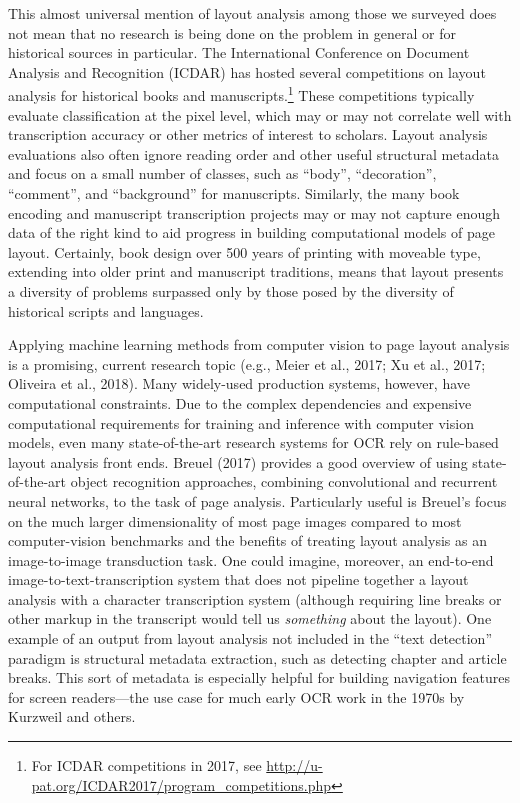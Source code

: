 \documentclass[twoside,11pt]{report}
\begin{document}
This almost universal mention of layout analysis among those we surveyed does not mean that no research is being done on the problem in general or for historical sources in particular. The International Conference on Document Analysis and Recognition (ICDAR) has hosted several competitions on layout analysis for historical books and manuscripts.\footnote{For ICDAR competitions in 2017, see \url{http://u-pat.org/ICDAR2017/program_competitions.php}}  These competitions typically evaluate classification at the pixel level, which may or may not correlate well with transcription accuracy or other metrics of interest to scholars. Layout analysis evaluations also often ignore reading order and other useful structural metadata and focus on a small number of classes, such as ``body'', ``decoration'', ``comment'', and ``background'' for manuscripts. Similarly, the many book encoding and manuscript transcription projects may or may not capture enough data of the right kind to aid progress in building computational models of page layout. Certainly, book design over 500 years of printing with moveable type, extending into older print and manuscript traditions, means that layout presents a diversity of problems surpassed only by those posed by the diversity of historical scripts and languages.

Applying machine learning methods from computer vision to page layout analysis is a promising, current research topic (e.g., Meier et al., 2017; Xu et al., 2017; Oliveira et al., 2018). Many widely-used production systems, however, have computational constraints. Due to the complex dependencies and expensive computational requirements for training and inference with computer vision models, even many state-of-the-art research systems for OCR rely on rule-based layout analysis front ends. Breuel (2017) provides a good overview of using state-of-the-art object recognition approaches, combining convolutional and recurrent neural networks, to the task of page analysis. Particularly useful is Breuel's focus on the much larger dimensionality of most page images compared to most computer-vision benchmarks and the benefits of treating layout analysis as an image-to-image transduction task. One could imagine, moreover, an end-to-end image-to-text-transcription system that does not pipeline together a layout analysis with a character transcription system (although requiring line breaks or other markup in the transcript would tell us \emph{something} about the layout). One example of an output from layout analysis not included in the ``text detection'' paradigm is structural metadata extraction, such as detecting chapter and article breaks. This sort of metadata is especially helpful for building navigation features for screen readers---the use case for much early OCR work in the 1970s by Kurzweil and others.
\end{document}
